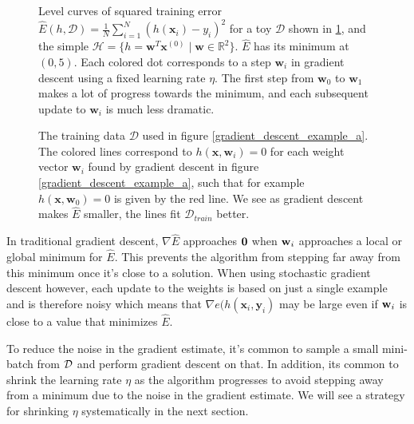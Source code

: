 \begin{figure}
	\hspace{9mm}
	\caption{Level curves of squared training error $\hat{E}(h, \mathcal{D}) = \frac{1}{N}\sum_{i=1}^N(h(\mathbf{x}_i) - y_i)^2$ for a toy $\mathcal{D}$ shown in \ref{gradient_descent_example_b}, and the simple $\mathcal{H} = \{h = \mathbf{w}^T\mathbf{x}^{(0)} \mid \mathbf{w} \in \mathbb{R}^2\}$. $\hat{E}$ has its minimum at $(0, 5)$. Each colored dot corresponds to a step $\mathbf{w}_i$ in gradient descent using a fixed learning rate $\eta$. The first step from $\mathbf{w}_0$ to $\mathbf{w}_1$ makes a lot of progress towards the minimum, and each subsequent update to $\mathbf{w}_i$ is much less dramatic.}
	\label{gradient_descent_example_a}
	\vspace{10mm}
	
	\caption{The training data $\mathcal{D}$ used in figure \ref{gradient_descent_example_a}. The colored lines correspond to $h(\mathbf{x}, \mathbf{w}_i) = 0$ for each weight vector $\mathbf{w}_i$ found by gradient descent in figure \ref{gradient_descent_example_a}, such that for example $h(\mathbf{x}, \mathbf{w}_0) = 0$ is given by the red line. We see as gradient descent makes $\hat{E}$ smaller, the lines fit $\mathcal{D}_{train}$ better.}
	\label{gradient_descent_example_b}
\end{figure}
\noindent
In traditional gradient descent, $\nabla \hat{E}$ approaches $\mathbf{0}$ when $\mathbf{w}_i$ approaches a local or global minimum for $\hat{E}$. This prevents the algorithm from stepping far away from this minimum once it's close to a solution. When using stochastic gradient descent however, each update to the weights is based on just a single example and is therefore noisy which means that $\nabla e(h(\mathbf{x}_i, \mathbf{y}_i)$ may be large even if $\mathbf{w}_i$ is close to a value that minimizes $\hat{E}$. 

To reduce the noise in the gradient estimate, it's common to sample a small mini-batch from $\mathcal{D}$ and perform gradient descent on that. In addition, its common to shrink the learning rate $\eta$ as the algorithm progresses to avoid stepping away from a minimum due to the noise in the gradient estimate. We will see a strategy for shrinking $\eta$ systematically in the next section.

